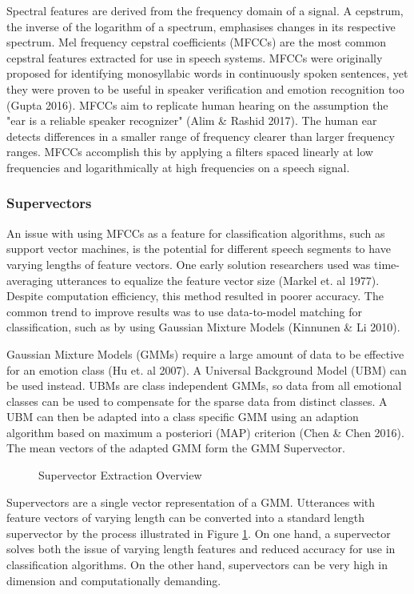 	Spectral features are derived from the frequency domain of a signal. A cepstrum, the inverse of the logarithm of a spectrum, emphasises changes in its respective spectrum. Mel frequency cepstral coefficients (MFCCs) are the most common cepstral features extracted for use in speech systems. MFCCs were originally proposed for identifying monosyllabic words in continuously spoken sentences, yet they were proven to be useful in speaker verification and emotion recognition too (Gupta 2016). MFCCs aim to replicate human hearing on the assumption the "ear is a reliable speaker recognizer" (Alim \& Rashid 2017). The human ear detects differences in a smaller range of frequency clearer than larger frequency ranges. MFCCs accomplish this by applying a filters spaced linearly at low frequencies and logarithmically at high frequencies on a speech signal.
	
\subsubsection{Supervectors}
	An issue with using MFCCs as a feature for classification algorithms, such as support vector machines, is the potential for different speech segments to have varying lengths of feature vectors. One early solution researchers used was time-averaging utterances to equalize the feature vector size (Markel et. al 1977). Despite computation efficiency, this method resulted in poorer accuracy. The common trend to improve results was to use data-to-model matching for classification, such as by using Gaussian Mixture Models (Kinnunen \& Li 2010).
	
	Gaussian Mixture Models (GMMs) require a large amount of data to be effective for an emotion class (Hu et. al 2007). A Universal Background Model (UBM) can be used instead. UBMs are class independent GMMs, so data from all emotional classes can be used to compensate for the sparse data from distinct classes. A UBM can then be adapted into a class specific GMM using an adaption algorithm based on maximum a posteriori (MAP) criterion (Chen \& Chen 2016). The mean vectors of the adapted GMM form the GMM Supervector.
	
	   \begin{figure}[!htb]
		\caption{\label{fig:supervec} Supervector Extraction Overview}
	\end{figure}

	Supervectors are a single vector representation of a GMM. Utterances with feature vectors of varying length can be converted into a standard length supervector by the process illustrated in Figure \ref{fig:supervec}. On one hand, a supervector solves both the issue of varying length features and reduced accuracy for use in classification algorithms. On the other hand, supervectors can be very high in dimension and computationally demanding.
